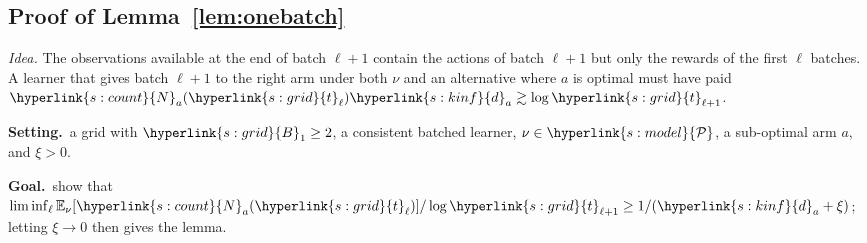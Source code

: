 \documentclass[10pt]{article}
\newcommand{\sy}[2]{{\hyperlink{#1}{#2}}}
\newcommand{\E}{\mathbb{E}}
\newcommand{\1}{\mathbf{1}}
\newcommand{\cP}{\sy{s:model}{\mathcal P}}
\newcommand{\da}{\sy{s:kinf}{d}_a}
\newcommand{\Ng}{\sy{s:count}{N}}
\newcommand{\tl}{\sy{s:grid}{t}}
\newcommand{\Bg}{\sy{s:grid}{B}}
\newcommand{\Setting}{\noindent\textbf{Setting.}\ }
\newcommand{\Goal}{\par\smallskip\noindent\textbf{Goal.}\ }
\begin{document}
\subsection{Proof of Lemma~\ref{lem:onebatch}}\label{sec:pf-lem:onebatch}
\noindent\emph{Idea.} The observations available at the end of batch $\ell+1$ contain the actions of batch $\ell+1$ but only the rewards of the first $\ell$ batches. A
learner that gives batch $\ell+1$ to the right arm under both $\nu$ and an alternative where $a$ is optimal must have paid $\Ng_a(\tl_\ell)\da\gtrsim\log\tl_{\ell+1}$.

\begin{setgoal}
\Setting a grid with $\Bg_1\ge2$, a consistent batched learner, $\nu\in\cP$, a sub-optimal arm $a$, and $\xi>0$.
\Goal show that $\liminf_\ell\E_\nu[\Ng_a(\tl_\ell)]/\log\tl_{\ell+1}\ge1/(\da+\xi)$; letting $\xi\to0$ then gives the lemma.
\end{setgoal}
\end{document}
